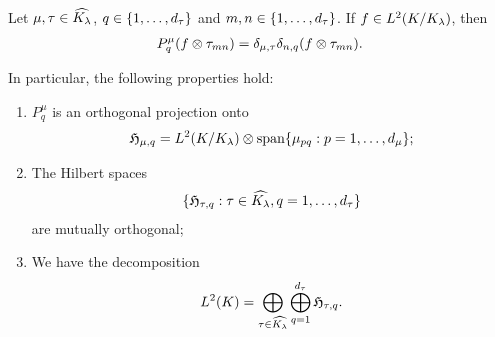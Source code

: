 \begin{lemma}
    Let $\mu, \tau \in {\widehat{{{K}_{\lambda}}}}$, $q \in \{1, \dots, {d_{\tau}}\}$ and $m, n \in \{1, \dots, {d_{\tau}} \}$.
    If $f \in {L^{2} ({{K} \slash{} {{{K}_{\lambda}}}})}$, then
    \begin{align*}
        P^\mu_q (f \otimes \tau_{m n}) = \delta_{\mu,\tau} \delta_{n,q} (f \otimes \tau_{m n}).
    \end{align*}

    In particular, the following properties hold:
    \begin{enumerate}
        \item $P^\mu_q$ is an orthogonal projection onto
            \begin{align*}
                \mathfrak{H}_{\mu, q} =
                    {L^{2} ({{K} \slash{} {{{K}_{\lambda}}}})}
                    \otimes
                    \operatorname{span} \{\mu_{p q} : p = 1, \dots, {d_{\mu}}\};
            \end{align*}
        \item The Hilbert spaces
            \begin{align*}
                \{\mathfrak{H}_{\tau, q} : \tau \in {\widehat{{{K}_{\lambda}}}}, q = 1, \dots, {d_{\tau}} \}
            \end{align*}
            are mutually orthogonal;
        \item We have the decomposition
            \begin{align*}
                {L^{2} (K)} = \bigoplus_{\tau \in {\widehat{{{K}_{\lambda}}}}} \bigoplus_{q = 1}^{{d_{\tau}}} \mathfrak{H}_{\tau, q}.
            \end{align*}
    \end{enumerate}
\end{lemma}
